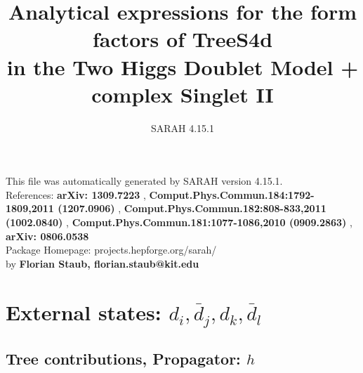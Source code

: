 \documentclass[A4,landscape]{article}
\begin{document}
\title{Analytical expressions for the form factors of TreeS4d\\ in the Two Higgs Doublet Model + complex Singlet II } 
 \author{SARAH 4.15.1} 
 \maketitle 
 \vspace{10cm} 
This file was automatically generated by SARAH version 4.15.1.  \\ 
References: {\bf arXiv: 1309.7223 }, {\bf Comput.Phys.Commun.184:1792-1809,2011 (1207.0906) }, {\bf Comput.Phys.Commun.182:808-833,2011 (1002.0840) }, {\bf Comput.Phys.Commun.181:1077-1086,2010 (0909.2863) }, {\bf arXiv: 0806.0538 } \\ 
Package Homepage: projects.hepforge.org/sarah/ \\ 
by {\bf Florian Staub, florian.staub@kit.edu} 
 \pagebreak 
 \tableofcontents 
 \pagebreak 
\section{External states: ${d_{{i}}, \bar{d}_{{j}}, d_{{k}}, \bar{d}_{{l}}}$} 
\subsection{Tree contributions, Propagator: $h$} 
\end{document}
